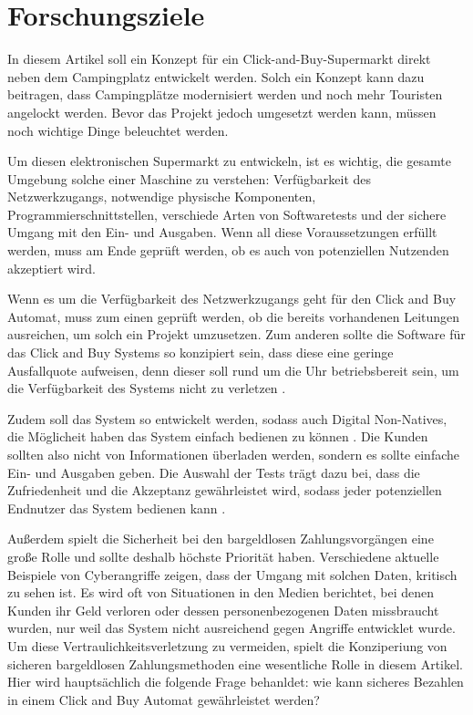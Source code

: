 \section{Forschungsziele}


In diesem Artikel soll ein Konzept für ein Click-and-Buy-Supermarkt direkt neben dem Campingplatz 
entwickelt werden. Solch ein Konzept kann dazu beitragen, dass Campingplätze modernisiert werden 
und noch mehr Touristen angelockt werden. Bevor das Projekt jedoch umgesetzt werden kann, müssen 
noch wichtige Dinge beleuchtet werden. 

Um diesen elektronischen Supermarkt zu entwickeln, ist es wichtig, die gesamte Umgebung solche einer Maschine
zu verstehen: Verfügbarkeit des Netzwerkzugangs, notwendige physische Komponenten, Programmierschnittstellen,
verschiede Arten von Softwaretests und der sichere Umgang mit den Ein- und Ausgaben. Wenn all diese 
Voraussetzungen erfüllt werden, muss am Ende geprüft werden, ob es auch von potenziellen Nutzenden 
akzeptiert wird. 

Wenn es um die Verfügbarkeit des Netzwerkzugangs geht für den Click and Buy Automat, muss zum einen 
geprüft werden, ob die bereits vorhandenen Leitungen ausreichen, um solch ein Projekt umzusetzen. Zum anderen 
sollte die Software für das Click and Buy Systems so konzipiert sein, dass diese eine geringe Ausfallquote
aufweisen, denn dieser soll rund um die Uhr betriebsbereit sein, um die Verfügbarkeit des Systems nicht zu
verletzen \cite{refbook:SWIS}.

Zudem soll das System so entwickelt werden, sodass auch  Digital Non-Natives, die Möglicheit 
haben das System einfach bedienen zu können \cite{refart:QWDN}. Die Kunden sollten also nicht von 
Informationen überladen werden,  sondern es sollte einfache Ein- und Ausgaben geben. Die Auswahl 
der Tests trägt dazu bei, dass die Zufriedenheit und die Akzeptanz gewährleistet wird, sodass jeder
potenziellen Endnutzer das System bedienen kann \cite{refbook:IASE}.

Außerdem spielt die Sicherheit bei den bargeldlosen Zahlungsvorgängen eine große Rolle und sollte deshalb 
höchste Priorität haben. Verschiedene aktuelle Beispiele von Cyberangriffe zeigen, dass der Umgang mit solchen 
Daten, kritisch zu sehen ist. Es wird oft von Situationen in den Medien berichtet, bei denen Kunden ihr
Geld verloren oder dessen personenbezogenen Daten missbraucht wurden, nur weil das System nicht ausreichend 
gegen Angriffe entwicklet wurde. Um diese Vertraulichkeitsverletzung zu vermeiden, spielt die Konziperiung 
von sicheren bargeldlosen Zahlungsmethoden eine wesentliche Rolle in diesem Artikel. Hier wird hauptsächlich
die folgende Frage behanldet: wie kann sicheres Bezahlen in einem Click and Buy Automat gewährleistet werden?